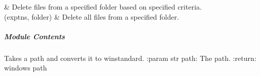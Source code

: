 \documentclass[letterpaper,10pt,english]{sphinxmanual}
\begin{document}
\begin{savenotes}
\begin{tabulary}{\linewidth}[t]{}
&
\sphinxAtStartPar
Delete files from a specified folder based on specified criteria.
\\
\sphinxhline
\sphinxAtStartPar
{\hyperref[\detokenize{autoapi/unduwave/helpers/file_folder_helpers/index:unduwave.helpers.file_folder_helpers.del_all_files}]{}}(exptns, folder)
&
\sphinxAtStartPar
Delete all files from a specified folder.
\\
\sphinxbottomrule
\end{tabulary}
\sphinxtableafterendhook\par
\sphinxattableend\end{savenotes}


\subparagraph{Module Contents}
\label{\detokenize{autoapi/unduwave/helpers/file_folder_helpers/index:module-contents}}

\begin{fulllineitems}
\label{\detokenize{autoapi/unduwave/helpers/file_folder_helpers/index:unduwave.helpers.file_folder_helpers.convert_path_to_win}}
\pysigstartsignatures
{}
\pysigstopsignatures
\sphinxAtStartPar
Takes a path and converts it to win\sphinxhyphen{}standard.
:param str path: The path.
:return: windows path

\end{fulllineitems}

\end{document}
